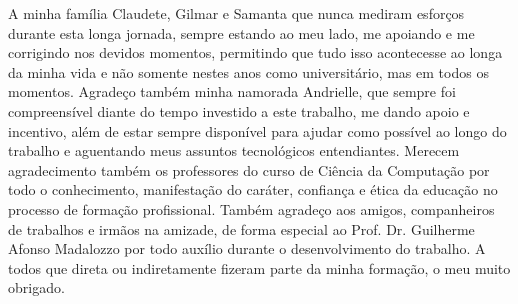 
\begin{resumo}[AGRADECIMENTOS]
\begin{SingleSpacing}

A minha família Claudete, Gilmar e Samanta que nunca mediram esforços durante esta longa jornada, sempre estando ao meu lado, me apoiando e me corrigindo nos devidos momentos, permitindo que tudo isso acontecesse ao longa da minha vida e não somente nestes anos como universitário, mas em todos os momentos. Agradeço também minha namorada Andrielle, que sempre foi compreensível diante do tempo investido a este trabalho, me dando apoio e incentivo, além de estar sempre disponível para ajudar como possível ao longo do trabalho e aguentando meus assuntos tecnológicos entendiantes. Merecem agradecimento também os professores do curso de Ciência da Computação por todo o conhecimento, manifestação do caráter, confiança e ética da educação no processo de formação profissional. Também agradeço aos amigos, companheiros de trabalhos e irmãos na amizade, de forma especial ao Prof. Dr. Guilherme Afonso Madalozzo por todo auxílio durante o desenvolvimento do trabalho. A todos que direta ou indiretamente fizeram parte da minha formação, o meu muito obrigado.

\end{SingleSpacing}
\end{resumo}